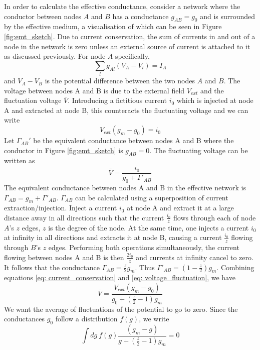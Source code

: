 In order to calculate the effective conductance, consider a network where the conductor between nodes $A$ and $B$ has a conductance $g_{\textit{AB}} = g_0$ and is surrounded by the effective medium, a visualisation of which can be seen in Figure \ref{fig:emt_sketch}. Due to current conservation, the sum of currents in and out of a node in the network is zero unless an external source of current is attached to it as discussed previously. For node $\textit{A}$ specifically,
\begin{equation}
\sum_\textit{l} g_{\textit{Al}} (V_\textit{A} - V_\textit{l}) = I_{\textit{A}}
\end{equation}
and $V_A-V_B$ is the potential difference between the two nodes $A$ and $B$. The voltage between nodes A and B is due to the external field $V_{ext}$ and the fluctuation voltage $\bar{V}$. Introducing a fictitious current $i_0$ which is injected at node A and extracted at node B, this counteracts the fluctuating voltage and we can write 
\begin{equation}
V_{ext}(g_m - g_0) = i_0
\label{eq: current_conservation}
\end{equation}
Let $\Gamma_{\textit{AB}}'$ be the equivalent conductance between nodes A and B where the conductor in Figure \ref{fig:emt_sketch} is $g_{\textit{AB}} = 0$. The fluctuating voltage can be written as 
\begin{equation}
\bar{V} = \frac{i_0}{g_0 + \Gamma'_{\textit{AB}}}
\label{eq: voltage_fluctuation}
\end{equation}
The equivalent conductance between nodes A and B in the effective network is $\Gamma_{\textit{AB}} = g_m + \Gamma'_{\textit{AB}}$. $\Gamma_{\textit{AB}}$ can be calculated using a superposition of current extraction/injection. Inject a current $i_0$ at node A and extract it at a large distance away in all directions such that the current $\frac{i_0}{z}$ flows through each of node $\textit{A}$'s $z$ edges, $z$ is the degree of the node. At the same time, one injects a current $i_0$ at infinity in all directions and extracts it at node B, causing a current $\frac{i_0}{z}$ flowing through $\textit{B}$'s $z$ edges. Performing both operations simultaneously, the current flowing between nodes A and B is then $\frac{2 i_0}{z}$ and currents at infinity cancel to zero. It follows that the conductance $\Gamma_{\textit{AB}} = \frac{z}{2}g_m$. Thus $\Gamma'_{\textit{AB}} = (1 - \frac{z}{2})g_m$. Combining equations \ref{eq: current_conservation} and \ref{eq: voltage_fluctuation}, we have
\begin{equation}
\bar{V} = \frac{V_{ext}(g_m - g_0)}{g_0 + (\frac{z}{2}-1)g_m}
\end{equation}
We want the average of fluctuations of the potential to go to zero. Since the conductances $g_0$ follow a distribution $f(g)$, we write
\begin{equation}
\int dg ~ f(g) \frac{(g_m - g)}{g + (\frac{z}{2}-1) g_m} = 0
\label{eq:emt_def_intro}
\end{equation}

